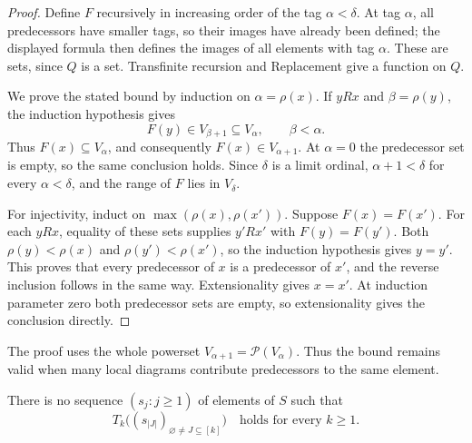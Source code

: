 \begin{proof}
Define \(F\) recursively in increasing order of the tag
\(\alpha<\delta\).  At tag \(\alpha\), all predecessors have
smaller tags, so their images have already been defined; the
displayed formula then defines the images of all elements
with tag \(\alpha\).  These are sets, since \(Q\) is a set.
Transfinite recursion and Replacement give a function on \(Q\).

We prove the stated bound by induction on \(\alpha=\rho(x)\).
If \(yRx\) and \(\beta=\rho(y)\), the induction hypothesis gives
\[
              F(y)\in V_{\beta+1}\subseteq V_\alpha,
              \qquad \beta<\alpha.
\]
Thus \(F(x)\subseteq V_\alpha\), and consequently
\(F(x)\in V_{\alpha+1}\).  At \(\alpha=0\) the predecessor
set is empty, so the same conclusion holds.  Since \(\delta\)
is a limit ordinal, \(\alpha+1<\delta\) for every
\(\alpha<\delta\), and the range of \(F\) lies in \(V_\delta\).

For injectivity, induct on \(\max(\rho(x),\rho(x'))\).
Suppose \(F(x)=F(x')\).  For each \(yRx\), equality of these
sets supplies \(y'Rx'\) with \(F(y)=F(y')\).  Both
\(\rho(y)<\rho(x)\) and \(\rho(y')<\rho(x')\), so the
induction hypothesis gives \(y=y'\).  This proves that every
predecessor of \(x\) is a predecessor of \(x'\), and the
reverse inclusion follows in the same way.  Extensionality
gives \(x=x'\).  At induction parameter zero both predecessor
sets are empty, so extensionality gives the conclusion directly.
\end{proof}

The proof uses the whole powerset \(V_{\alpha+1}=\mathcal P(V_\alpha)\).
Thus the bound remains valid when many local diagrams contribute
predecessors to the same element.

\begin{lemma}\label{col:no-pattern}
There is no sequence \((s_j:j\ge1)\) of elements of \(S\) such that
\begin{equation}\label{col:fixed-pattern}
           T_k\bigl((s_{|J|})_{\varnothing\ne J\subseteq[k]}\bigr)
           \quad\text{holds for every }k\ge1.
\end{equation}
\end{lemma}

